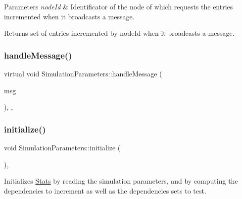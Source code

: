 \begin{DoxyParams}{Parameters}
{\em node\+Id} & Identificator of the node of which requests the entries incremented when it broadcasts a message. \\
\hline
\end{DoxyParams}
\begin{DoxyReturn}{Returns}
set of entries incremented by node\+Id when it broadcasts a message. 
\end{DoxyReturn}
\mbox{\label{class_simulation_parameters_a8983c7bf9d840f8b4a9a4d55c04d581a}} 
\subsubsection{\texorpdfstring{handle\+Message()}{handleMessage()}}
{\footnotesize\ttfamily virtual void Simulation\+Parameters\+::handle\+Message (\begin{DoxyParamCaption}\item[{c\+Message $\ast$}]{msg }\end{DoxyParamCaption})\hspace{0.3cm}{\ttfamily [inline]}, {\ttfamily [protected]}, {\ttfamily [virtual]}}

\mbox{\label{class_simulation_parameters_a1fa495ef59a10cb9a0aff42f3e2625ef}} 
\subsubsection{\texorpdfstring{initialize()}{initialize()}}
{\footnotesize\ttfamily void Simulation\+Parameters\+::initialize (\begin{DoxyParamCaption}{ }\end{DoxyParamCaption})\hspace{0.3cm}{\ttfamily [protected]}, {\ttfamily [virtual]}}



Initializes \hyperlink{class_stats}{Stats} by reading the simulation parameters, and by computing the dependencies to increment as well as the dependencies sets to test. 

